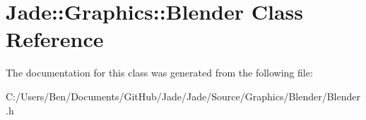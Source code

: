\hypertarget{class_jade_1_1_graphics_1_1_blender}{}\section{Jade\+:\+:Graphics\+:\+:Blender Class Reference}
\label{class_jade_1_1_graphics_1_1_blender}


The documentation for this class was generated from the following file\+:\begin{DoxyCompactItemize}
\item 
C\+:/\+Users/\+Ben/\+Documents/\+Git\+Hub/\+Jade/\+Jade/\+Source/\+Graphics/\+Blender/Blender.\+h\end{DoxyCompactItemize}
